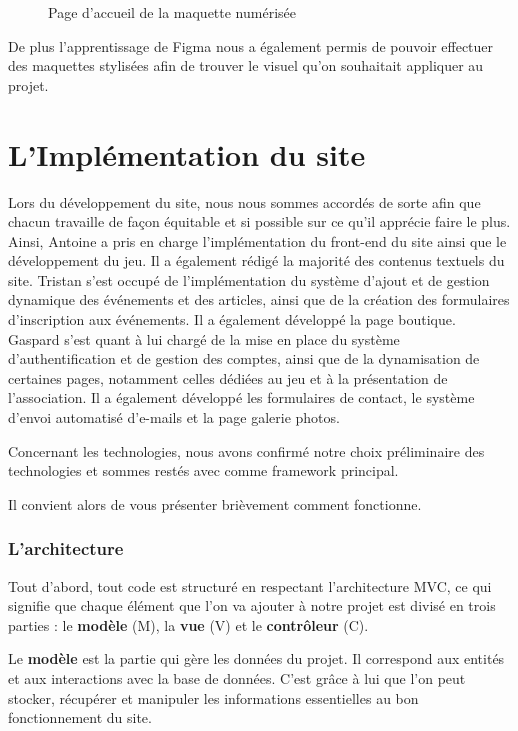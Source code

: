 \begin{figure}[H]
    \caption{Page d'accueil de la maquette numérisée}
    \label{fig:enter-label}
\end{figure}

De plus l'apprentissage de Figma nous a également permis de pouvoir effectuer des maquettes stylisées afin de trouver le visuel qu'on souhaitait appliquer au projet.



\section{L'Implémentation du site}

Lors du développement du site, nous nous sommes accordés de sorte afin que chacun travaille de façon équitable et si possible sur ce qu'il apprécie faire le plus. 
Ainsi, Antoine a pris en charge l’implémentation du front-end du site ainsi que le développement du jeu. Il a également rédigé la majorité des contenus textuels du site.  
Tristan s’est occupé de l’implémentation du système d’ajout et de gestion dynamique des événements et des articles, ainsi que de la création des formulaires d’inscription aux événements. Il a également développé la page boutique.
Gaspard s’est quant à lui chargé de la mise en place du système d’authentification et de gestion des comptes, ainsi que de la dynamisation de certaines pages, notamment celles dédiées au jeu et à la présentation de l’association. Il a également développé les formulaires de contact, le système d’envoi automatisé d’e-mails et la page galerie photos.

Concernant les technologies, nous avons confirmé notre choix préliminaire des technologies et sommes restés avec  comme framework principal.

Il convient alors de vous présenter brièvement comment  fonctionne.

\subsubsection*{L'architecture }

Tout d'abord, tout code  est structuré en respectant l'architecture MVC, ce qui signifie que chaque élément que l'on va ajouter à notre projet est divisé en trois parties : le \textbf{modèle} (M), la \textbf{vue} (V) et le \textbf{contrôleur} (C). 

Le \textbf{modèle} est la partie qui gère les données du projet. Il correspond aux entités et aux interactions avec la base de données. C’est grâce à lui que l’on peut stocker, récupérer et manipuler les informations essentielles au bon fonctionnement du site.

